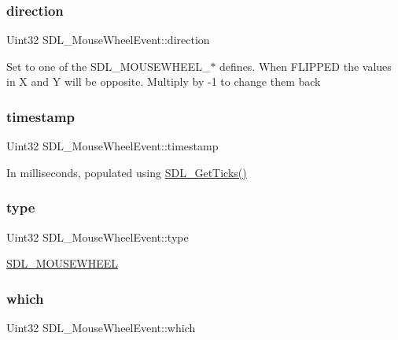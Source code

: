 \subsubsection{\texorpdfstring{direction}{direction}}
{\footnotesize\ttfamily Uint32 S\+D\+L\+\_\+\+Mouse\+Wheel\+Event\+::direction}

Set to one of the S\+D\+L\+\_\+\+M\+O\+U\+S\+E\+W\+H\+E\+E\+L\+\_\+$\ast$ defines. When F\+L\+I\+P\+P\+ED the values in X and Y will be opposite. Multiply by -\/1 to change them back \mbox{\label{structSDL__MouseWheelEvent_a83ad52c80ff49a8e75dc6c33bba65fa0}} 
\subsubsection{\texorpdfstring{timestamp}{timestamp}}
{\footnotesize\ttfamily Uint32 S\+D\+L\+\_\+\+Mouse\+Wheel\+Event\+::timestamp}

In milliseconds, populated using \hyperlink{SDL__timer_8h_a0b9bc71d6287e0ffafdc3419760fe2b3}{S\+D\+L\+\_\+\+Get\+Ticks()} \mbox{\label{structSDL__MouseWheelEvent_aa6b741e99df708c6f9550ee0f520fb70}} 
\subsubsection{\texorpdfstring{type}{type}}
{\footnotesize\ttfamily Uint32 S\+D\+L\+\_\+\+Mouse\+Wheel\+Event\+::type}

\hyperlink{SDL__events_8h_a3b589e89be6b35c02e0dd34a55f3fccaa63135c2e0aea2286f05066f3c0bc5c4e}{S\+D\+L\+\_\+\+M\+O\+U\+S\+E\+W\+H\+E\+EL} \mbox{\label{structSDL__MouseWheelEvent_a014dc767d52e8b75ba26a5f12e1704e8}} 
\subsubsection{\texorpdfstring{which}{which}}
{\footnotesize\ttfamily Uint32 S\+D\+L\+\_\+\+Mouse\+Wheel\+Event\+::which}

